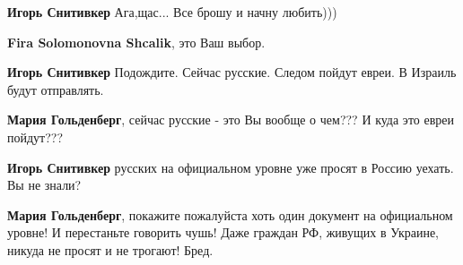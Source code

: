\begin{itemize}
\begin{itemize}
\textbf{Игорь Снитивкер}
Ага,щас...
Все брошу и начну любить)))

 
\textbf{Fira Solomonovna Shcalik}, это Ваш выбор.

 
\textbf{Игорь Снитивкер} Подождите. Сейчас русские. Следом пойдут евреи. В Израиль будут отправлять.

 
\textbf{Мария Гольденберг}, сейчас русские - это Вы вообще о чем??? И куда это евреи пойдут???

 
\textbf{Игорь Снитивкер} русских на официальном уровне уже просят в Россию уехать. Вы не знали?

 
\textbf{Мария Гольденберг}, покажите пожалуйста хоть один документ на
официальном уровне! И перестаньте говорить чушь! Даже граждан РФ, живущих в
Украине, никуда не просят и не трогают! Бред.

 

\end{itemize}
\end{itemize}
